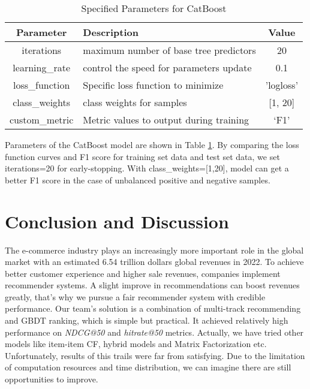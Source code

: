 \documentclass[manuscript,noacm]{acmart}
\begin{document}
\begin{table}[H]
\caption{Specified Parameters for CatBoost}

\begin{tabular}{c p{6cm} c}
\toprule
Parameter& Description& Value\\
\midrule
iterations     & maximum number of base tree predictors & 20\\ 
learning\_rate & control the speed for parameters update & 0.1\\ 
loss\_function & Specific loss function to minimize & 'logloss'   \\ 
class\_weights & class weights for samples & {[}1, 20{]} \\ 
custom\_metric &  Metric values to output during training & ‘F1’\\ 
\bottomrule
\end{tabular}
\label{catboost}
\end{table}

Parameters of the CatBoost model are shown in Table \ref{catboost}.  By comparing the loss function curves and F1 score for training set data and test set data, we set iterations=20 for early-stopping. With class\_weights=[1,20], model can get a better F1 score in the case of unbalanced positive and negative samples.


\section{Conclusion and Discussion}
The e-commerce industry plays an increasingly more important role in the global market with an estimated 6.54 trillion dollars global revenues in 2022. To achieve better customer experience and higher sale revenues, companies implement recommender systems. A slight improve in recommendations can boost revenues greatly, that's why we pursue a fair recommender system with credible performance. Our team's solution is a combination of multi-track recommending and GBDT ranking, which is simple but practical. It achieved relatively high performance on \textit{NDCG@50} and \textit{hitrate@50} metrics. Actually, we have tried other models like item-item CF, hybrid models and Matrix Factorization etc. Unfortunately, results of this trails were far from satisfying. Due to the limitation of computation resources and time distribution, we can imagine there are still opportunities to improve.



\end{document}
